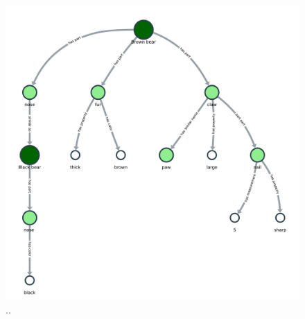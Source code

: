 \documentclass[a4paper, 12pt, oneside]{book} %
\begin{document}
\begin{figure}[htpb]
 \centering
 \includegraphics[width=\textwidth]{figures/kngraph_rec.pdf}
 \caption[Knowledge Graph Future Example]{..}
 \label{fig:kngraph_rec}
\end{figure}


\printbibliography
\newpage
\end{document}
